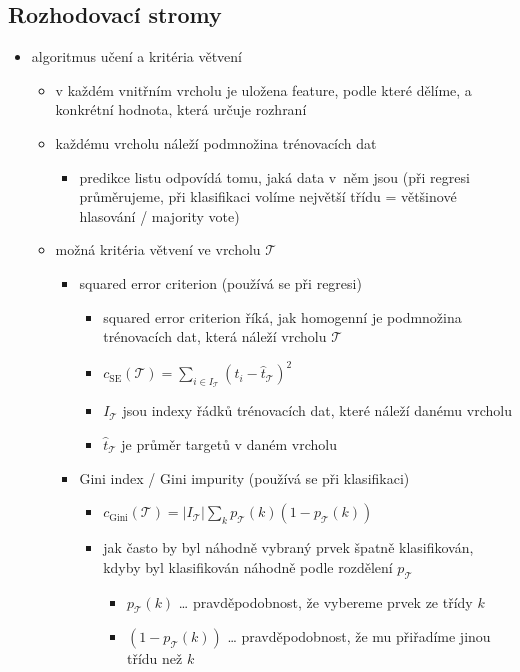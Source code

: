 \subsection{Rozhodovací stromy}
\begin{itemize}
\item algoritmus učení a kritéria větvení
\begin{itemize}
\item v každém vnitřním vrcholu je uložena feature, podle které dělíme, a konkrétní hodnota, která určuje rozhraní
\item každému vrcholu náleží podmnožina trénovacích dat
\begin{itemize}
\item predikce listu odpovídá tomu, jaká data v~něm jsou (při regresi průměrujeme, při klasifikaci volíme největší třídu = většinové hlasování / majority vote)
\end{itemize}
\item možná kritéria větvení ve vrcholu $\mathcal T$
\begin{itemize}
\item squared error criterion (používá se při regresi)
\begin{itemize}
\item squared error criterion říká, jak homogenní je podmnožina trénovacích dat, která náleží vrcholu $\mathcal T$
\item $c_\text{SE}(\mathcal T)=\sum_{i\in I_\mathcal T}(t_i-\hat t_{\mathcal T})^2$
\item $I_\mathcal T$ jsou indexy řádků trénovacích dat, které náleží danému vrcholu
\item $\hat t_\mathcal T$ je průměr targetů v daném vrcholu
\end{itemize}
\item Gini index / Gini impurity (používá se při klasifikaci)
\begin{itemize}
\item $c_\text{Gini}(\mathcal T)=|I_\mathcal T|\sum_kp_\mathcal T(k)(1-p_\mathcal T(k))$
\item jak často by byl náhodně vybraný prvek špatně klasifikován, kdyby byl klasifikován náhodně podle rozdělení $p_\mathcal T$
\begin{itemize}
\item $p_\mathcal T(k)$ \dots{} pravděpodobnost, že vybereme prvek ze třídy $k$
\item $(1-p_\mathcal T(k))$ \dots{} pravděpodobnost, že mu přiřadíme jinou třídu než $k$
\end{itemize}

\end{itemize}
\end{itemize}
\end{itemize}
\end{itemize}
